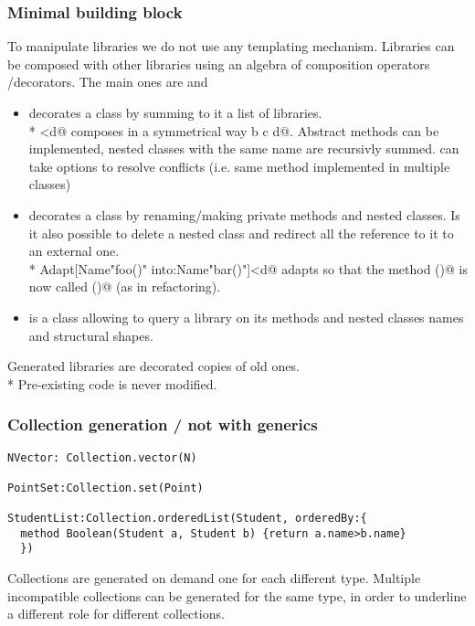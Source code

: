 \begin{frame}[fragile]
\frametitle{Minimal building block}
To manipulate libraries we do not use any templating mechanism.
Libraries can be composed with other libraries using an algebra of composition operators /decorators.
The main ones are \Q@Use@ and \Q@Adapt@
\begin{itemize}
\item \Q@Use@ decorates a class by summing to it a list of libraries.
\\*
\Q@Use[a;b;c]<d@ composes in a symmetrical way \Q@a b c d@. Abstract methods can be implemented, nested classes with the same name are recursivly summed.
\Q@Use@ can take options to resolve conflicts (i.e. same method implemented in multiple classes)
\item \Q@Adapt@ decorates a class by renaming/making private methods and nested classes.
Is it also possible to delete a  nested class and redirect all the reference to it to an external one.
\\*
\Q@ Adapt[Name"foo()" into:Name"bar()"]<d@
 adapts \Q@d@ so that the method \Q@foo()@ is now called \Q@bar()@ (as in refactoring).
\item \Q@Introspect@ is a class allowing to query a library on its methods and nested classes names and structural shapes.

\end{itemize}
Generated libraries are decorated copies of old ones.
\\*
Pre-existing code is never modified.
\end{frame}


\begin{frame}[fragile]
\frametitle{Collection generation / not with generics}
\begin{NiceCode}{59ex}{0.8}
\begin{lstlisting}
NVector: Collection.vector(N)

PointSet:Collection.set(Point)

StudentList:Collection.orderedList(Student, orderedBy:{
  method Boolean(Student a, Student b) {return a.name>b.name}
  })
\end{lstlisting}
\end{NiceCode}
Collections are generated on demand one for each different type.
Multiple incompatible collections can be generated for the same type, in order to underline a different role for different collections.
\end{frame}

